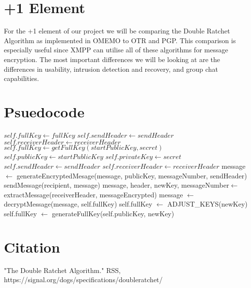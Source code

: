 \documentclass{article}
\begin{document}
\section{+1 Element}

For the +1 element of our project we will be comparing the Double Ratchet Algorithm as implemented in OMEMO to OTR and PGP. 
This comparison is especially useful since XMPP can utilise all of these algorithms for message encryption.
The most important differences we will be looking at are the differences in usability, intrusion detection and recovery, and group chat capabilities. 

\section{Psuedocode}

    \begin{algorithm}
    \begin{algorithmic}
		\State $self.fullKey \gets fullKey$
		\State $self.sendHeader \gets sendHeader$
		\State $self.receiverHeader \gets receiverHeader$
	\EndProcedure
		\State $self.fullKey \gets getFullKey(startPublicKey, secret)$
		\State $self.publicKey \gets startPublicKey$
		\State $self.privateKey \gets secret$
		\State $self.sendHeader \gets sendHeader$
		\State $self.receiverHeader \gets receiverHeader$
	\EndProcedure
		\State message $\gets$ generateEncryptedMesage(message, publicKey, messageNumber, sendHeader) 
		\State sendMessage(recipient, message)
	\EndProcedure
		\State message, header, newKey, messageNumber$\gets$ extractMessage(receiverHeader, messageEncrypted)
		\State message $\gets$ decryptMessage(message, self.fullKey) 
		\State self.fullKey $\gets$ ADJUST\_KEYS(newKey)
	\EndProcedure
		\State self.fullKey $\gets$ generateFullKey(self.publicKey, newKey)
	\EndProcedure
    	\end{algorithmic}
    \end{algorithm}

\section{Citation}

"The Double Ratchet Algorithm." RSS, https://signal.org/dogs/specifications/doubleratchet/


    
	
	    
\end{document}
